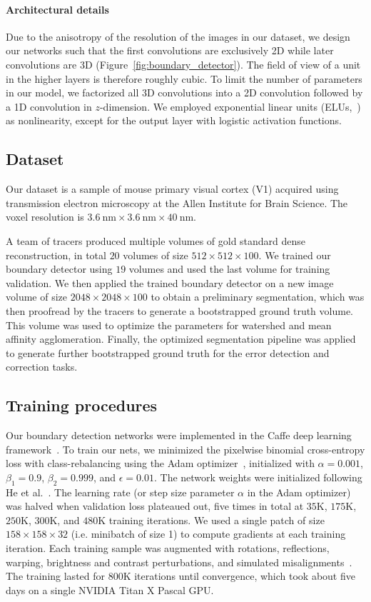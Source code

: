 \documentclass{article}
\begin{document}
\paragraph{Architectural details} Due to the anisotropy of the resolution of
the images in our dataset, we design our networks such that the first
convolutions are exclusively 2D while later convolutions are 3D
(Figure~\ref{fig:boundary_detector}). The field of view of a unit in the higher
layers is therefore roughly cubic. To limit the number of parameters in our
model, we factorized all 3D convolutions into a 2D convolution followed by a 1D
convolution in $z$-dimension. We employed exponential linear units
(ELUs,~\cite{elu}) as nonlinearity, except for the output layer with logistic
activation functions.

\subsection{Dataset}
Our dataset is a sample of mouse primary visual cortex (V1) acquired using
transmission electron microscopy at the Allen Institute for Brain Science. The
voxel resolution is $3.6~\text{nm} \times 3.6~\text{nm} \times 40~\text{nm}$.

A team of tracers produced multiple volumes of gold standard dense
reconstruction, in total $20$ volumes of size $512 \times 512 \times 100$. We
trained our boundary detector using $19$ volumes and used the last volume for
training validation. We then applied the trained boundary detector on a new
image volume of size $2048 \times 2048 \times 100$ to obtain a preliminary
segmentation, which was then proofread by the tracers to generate a bootstrapped
ground truth volume. This volume was used to optimize the parameters for
watershed and mean affinity agglomeration. Finally, the optimized segmentation
pipeline was applied to generate further bootstrapped ground truth for the error
detection and correction tasks.

\subsection{Training procedures} Our boundary detection networks were
implemented in the Caffe deep learning framework~\cite{jia2014caffe}. To train
our nets, we minimized the pixelwise binomial cross-entropy loss with
class-rebalancing using the Adam optimizer~\cite{adam}, initialized with
$\alpha=0.001$, $\beta_1=0.9$, $\beta_2=0.999$, and $\epsilon=0.01$. The network
weights were initialized following He et al.~\cite{he2015delving}. The learning
rate (or step size parameter $\alpha$ in the Adam optimizer) was halved when
validation loss plateaued out, five times in total at $35$K, $175$K, $250$K,
$300$K, and $480$K training iterations. We used a single patch of size
$158\times158\times32$ (i.e. minibatch of size 1) to compute gradients at each
training iteration. Each training sample was augmented with rotations,
reflections, warping, brightness and contrast perturbations, and simulated
misalignments~\cite{kisuk}. The training lasted for $800$K iterations until
convergence, which took about five days on a single NVIDIA Titan X Pascal GPU.
\end{document}
